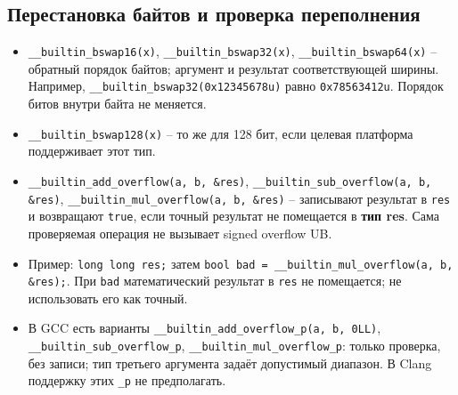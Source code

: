 \subsection{Перестановка байтов и проверка переполнения}
\begin{itemize}[leftmargin=*, nosep]
\item \verb|__builtin_bswap16(x)|, \verb|__builtin_bswap32(x)|, \verb|__builtin_bswap64(x)| -- обратный порядок байтов; аргумент и результат соответствующей ширины. Например, \verb|__builtin_bswap32(0x12345678u)| равно \verb|0x78563412u|. Порядок битов внутри байта не меняется.
\item \verb|__builtin_bswap128(x)| -- то же для 128 бит, если целевая платформа поддерживает этот тип.
\item \verb|__builtin_add_overflow(a, b, &res)|, \verb|__builtin_sub_overflow(a, b, &res)|, \verb|__builtin_mul_overflow(a, b, &res)| -- записывают результат в \verb|res| и возвращают \verb|true|, если точный результат не помещается в \textbf{тип res}. Сама проверяемая операция не вызывает signed overflow UB.
\item Пример: \verb|long long res;| затем \verb|bool bad = __builtin_mul_overflow(a, b, &res);|. При \verb|bad| математический результат в \verb|res| не помещается; не использовать его как точный.
\item В GCC есть варианты \verb|__builtin_add_overflow_p(a, b, 0LL)|, \verb|__builtin_sub_overflow_p|, \verb|__builtin_mul_overflow_p|: только проверка, без записи; тип третьего аргумента задаёт допустимый диапазон. В Clang поддержку этих \verb|_p| не предполагать.
\end{itemize}

